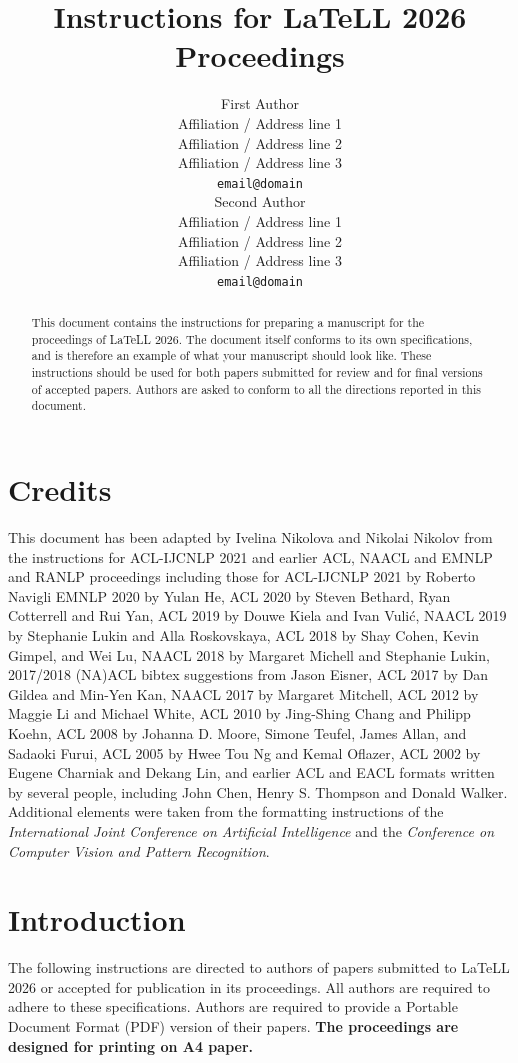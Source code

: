 \documentclass[11pt,a4paper]{article}
\title{Instructions for LaTeLL 2026 Proceedings}
\author{First Author \\
  Affiliation / Address line 1 \\
  Affiliation / Address line 2 \\
  Affiliation / Address line 3 \\
  \texttt{email@domain} \\\And
  Second Author \\
  Affiliation / Address line 1 \\
  Affiliation / Address line 2 \\
  Affiliation / Address line 3 \\
  \texttt{email@domain} \\}
\date{}
\begin{document}
\maketitle
\begin{abstract}
This document contains the instructions for preparing a manuscript for the proceedings of LaTeLL 2026.
The document itself conforms to its own specifications, and is therefore an example of what your manuscript should look like.
These instructions should be used for both papers submitted for review and for final versions of accepted papers.
Authors are asked to conform to all the directions reported in this document.
\end{abstract}

\section{Credits}

This document has been adapted by Ivelina Nikolova and Nikolai Nikolov from the instructions for ACL-IJCNLP 2021 and earlier ACL, NAACL and EMNLP and RANLP proceedings including those for 
ACL-IJCNLP 2021 by Roberto Navigli
EMNLP 2020 by Yulan He,
ACL 2020 by Steven Bethard, Ryan Cotterrell and Rui Yan, 
ACL 2019 by Douwe Kiela and Ivan Vuli\'{c},
NAACL 2019 by Stephanie Lukin and Alla Roskovskaya, 
ACL 2018 by Shay Cohen, Kevin Gimpel, and Wei Lu, 
NAACL 2018 by Margaret Michell and Stephanie Lukin,
2017/2018 (NA)ACL bibtex suggestions from Jason Eisner,
ACL 2017 by Dan Gildea and Min-Yen Kan, 
NAACL 2017 by Margaret Mitchell, 
ACL 2012 by Maggie Li and Michael White, 
ACL 2010 by Jing-Shing Chang and Philipp Koehn, 
ACL 2008 by Johanna D. Moore, Simone Teufel, James Allan, and Sadaoki Furui, 
ACL 2005 by Hwee Tou Ng and Kemal Oflazer, 
ACL 2002 by Eugene Charniak and Dekang Lin, 
and earlier ACL and EACL formats written by several people, including
John Chen, Henry S. Thompson and Donald Walker.
Additional elements were taken from the formatting instructions of the \emph{International Joint Conference on Artificial Intelligence} and the \emph{Conference on Computer Vision and Pattern Recognition}.

\section{Introduction}

The following instructions are directed to authors of papers submitted to LaTeLL 2026 or accepted for publication in its proceedings.
All authors are required to adhere to these specifications.
Authors are required to provide a Portable Document Format (PDF) version of their papers.
\textbf{The proceedings are designed for printing on A4 paper.}
\end{document}
